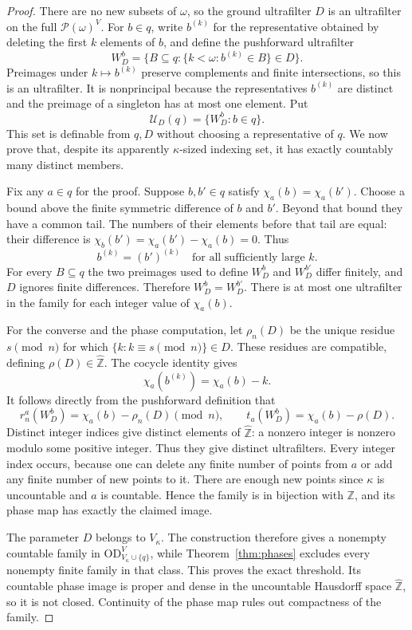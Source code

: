 \documentclass[11pt,letterpaper]{article}
\theoremstyle{definition}
\numberwithin{equation}{section}
\newcommand{\OD}{\mathrm{OD}}
\newcommand{\ZZ}{\mathbb Z}
\newcommand{\zhat}{\widehat{\mathbb Z}}
\newcommand{\ODlow}{\OD_{V_\kappa\cup\{q\}}^{V}}
\newcommand{\powerset}{\mathcal P}
\begin{document}
\begin{proof}
There are no new subsets of $\omega$, so the ground ultrafilter $D$
is an ultrafilter on the full $\powerset(\omega)^V$. For $b\in q$, write
$b^{(k)}$ for the representative obtained by deleting the first $k$
elements of $b$, and define the pushforward ultrafilter
\[
 W_D^b=\{B\subseteq q:\{k<\omega:b^{(k)}\in B\}\in D\}.
\]
Preimages under $k\mapsto b^{(k)}$ preserve complements and finite
intersections, so this is an ultrafilter. It is nonprincipal because the
representatives $b^{(k)}$ are distinct and the preimage of a singleton has
at most one element. Put
\[
 \mathcal U_D(q)=\{W_D^b:b\in q\}.
\]
This set is definable from $q,D$ without choosing a representative of $q$.
We now prove that, despite its apparently $\kappa$-sized indexing set,
it has exactly countably many distinct members.

Fix any $a\in q$ for the proof. Suppose $b,b'\in q$ satisfy
$\chi_a(b)=\chi_a(b')$. Choose a bound above the finite symmetric
difference of $b$ and $b'$. Beyond that bound they have a common tail.
The numbers of their elements before that tail are equal: their difference
is $\chi_b(b')=\chi_a(b')-\chi_a(b)=0$. Thus
\[
 b^{(k)}=(b')^{(k)}\quad\text{for all sufficiently large }k.
\]
For every $B\subseteq q$ the two preimages used to define $W_D^b$ and
$W_D^{b'}$ differ finitely, and $D$ ignores finite differences. Therefore
$W_D^b=W_D^{b'}$. There is at most one ultrafilter in the family for each
integer value of $\chi_a(b)$.

For the converse and the phase computation, let $\rho_n(D)$ be the unique
residue $s\pmod n$ for which $\{k:k\equiv s\pmod n\}\in D$. These
residues are compatible, defining $\rho(D)\in\zhat$. The cocycle identity
gives
\[
 \chi_a(b^{(k)})=\chi_a(b)-k.
\]
It follows directly from the pushforward definition that
\[
 r_n^a(W_D^b)=\chi_a(b)-\rho_n(D)\pmod n,
 \qquad
 t_a(W_D^b)=\chi_a(b)-\rho(D).
\]
Distinct integer indices give distinct elements of $\zhat$: a nonzero
integer is nonzero modulo some positive integer. Thus they give distinct
ultrafilters. Every integer index occurs, because one can delete any
finite number of points from $a$ or add any finite number of new points
to it. There are enough new points since $\kappa$ is uncountable and $a$
is countable. Hence the family is in bijection with $\ZZ$, and its phase
map has exactly the claimed image.

The parameter $D$ belongs to $V_\kappa$. The construction therefore gives
a nonempty countable family in $\ODlow$, while
Theorem~\ref{thm:phases} excludes every nonempty finite family in that
class. This proves the exact threshold. Its countable phase image is
proper and dense in the uncountable Hausdorff space $\zhat$, so it is not
closed. Continuity of the phase map rules out compactness of the family.
\end{proof}
\end{document}

